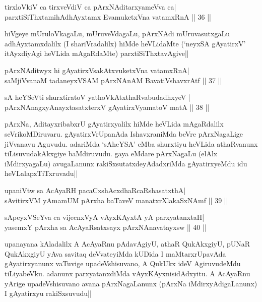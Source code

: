 
\begin{shl}
tirxloVkiV ca tirxveVdiV ca pArxNAditarxyameVva ca| \\
parxtiSiThxtamihAdhAyxtamx EvamuketxVna vatamxRnA \hfill ||  36 || 
\end{shl}

\begin{artha} 
hiVgeye mUruloVkagaLu, mUruveVdagaLu, pArxNAdi mUruvasutxgaLu 
adhAyxtamxdalilx (I shariVradalilx) hiMde heVLidaMte (`neyxSA 
gAyatirxV' itAyxdiyAgi heVLida mAgaRdaMte) parxtiSiThxtavAgive||
\end{artha}

\begin{shl}
pArxNAditwyx hi gAyatirxVsakAtxvuketxVna vatamxRnA| \\
saMjiVvanaM tadaneyxVSAM pArxNAnAM BavatiVshavxrAtf \hfill ||  37 || 
\end{shl}

\begin{shl}
sA heYSeVti shurxtiratoV yathoVkAtxthaRvabudadhxyeV | \\
pArxNAnagxyAnayxtasatxterxV gAyatirxVyamatoV matA \hfill ||  38 || 
\end{shl}

\begin{artha} 
pArxNa, AditayxribabxrU gAyatirxyalilx hiMde heVLida mAgaRdalilx 
seVrikoMDiruvaru. gAyatirxVrUpanAda IshavxraniMda beVre pArxNagaLige 
jiVvanavu Aguvudu. adariMda `sAheYSA' eMba shurxtiyu heVLida 
athaRvanunx tiLisuvudakAkxgiye baMdiruvudu. gaya eMdare pArxNagaLu 
(elAlx iMdirxyagaLu) avugaLanunx rakiSxsutatxdeyAdadxriMda 
gAyatirxyeMdu idu heVLalapxTiTxruvadu||
\end{artha}


\begin{shl}
upaniVtw sa AcAyaRH pacaCxshAcxdhaRcaRshasatxthA| \\
sAvitirxVM yAmamUM pArxha baTaveV manatxrXlakaSxNAmf \hfill ||  39 ||
\end{shl}

\begin{shl}
sA\s peyxVSeYva ca vijecnxVyA vAyxKAyxtA yA parxyatanxtaH| \\
yasemxY pArxha sa AcAyaRsatxsayx pArxNAnavatayxsw \hfill ||  40 || 
\end{shl}

\begin{artha} 
upanayana kAladalilx A AcAyaRnu pAdavAgiyU, athaR QukAkxgiyU, pUNaR 
QukAkxgiyU yAva savitaq deVvateyiMda kUDida I maMtarxrUpavAda 
gAyatirxyanunx vaTuvige upadeVshisuvano, A QukUkx ideV AgiruvudeMdu 
tiLiyabeVku. adanunx parxyatanxdiMda vAyxKAyxnisidAdxyitu. A AcAyaRnu 
yArige upadeVshisuvano avana pArxNagaLanunx (pArxNa 
iMdirxyAdigaLanunx) I gAyatirxyu rakiSxsuvudu||
\end{artha}

